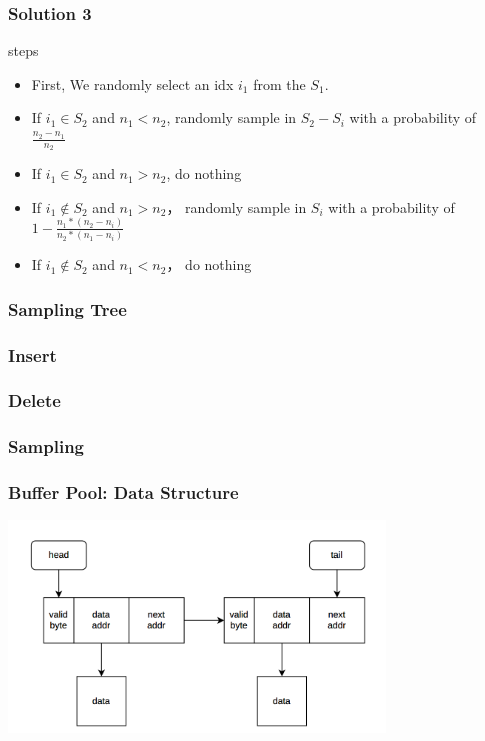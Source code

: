 \documentclass[notheorems, aspectratio=54]{beamer}
\begin{document}
\begin{frame}
    \frametitle{Solution 3}
        \begin{block} {steps}
            \begin{itemize}
                \item First, We randomly select an idx $i_1$ from the $S_1$.
                \item If $i_1 \in S_2$ and $n_1 < n_2$, randomly sample in $S_2-S_i$ with a probability of $\frac{n_2-n_1}{n_2}$ 
                \item If $i_1 \in S_2$ and $n_1 > n_2$, do nothing
                \item If $i_1 \notin S_2$ and $n_1 > n_2$， randomly sample in $S_i$ with a probability of $1-\frac{n_1*(n_2-n_i)}{n_2*(n_1-n_i)}$
                \item If $i_1 \notin S_2$ and $n_1 < n_2$， do nothing
            \end{itemize}
        \end{block}
\end{frame}

\begin{frame}
    \frametitle{Sampling Tree}
    
\end{frame}

\begin{frame}
    \frametitle{Insert}
    
\end{frame}

\begin{frame}
    \frametitle{Delete}
    
\end{frame}

\begin{frame}
    \frametitle{Sampling}
    
\end{frame}

\begin{frame}
    \frametitle{Buffer Pool: Data Structure}
    \centering
    \includegraphics[width=10cm]{global_img_dir/linklist.png}
\end{frame}
\end{document}
